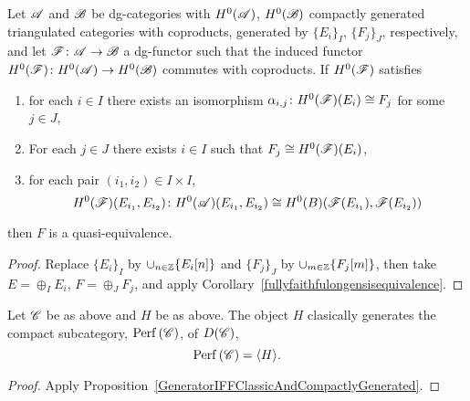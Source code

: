 \documentclass[dissertation.tex]{subfiles}
\begin{document}
\begin{prop}
  Let $\mathscr{A}$ and $\mathscr{B}$ be dg-categories with $H^0(\mathscr{A})$, $H^0(\mathscr{B})$ compactly generated triangulated categories with coproducts, generated by $\{E_i\}_I$, $\{F_j\}_J$, respectively, and let $\mathscr{F} \colon \mathscr{A} \to\mathscr{B}$ a dg-functor such that the induced functor $H^0(\mathscr{F}) \colon H^0(\mathscr{A}) \to H^0(\mathscr{B})$ commutes with coproducts.
  If $H^0(\mathscr{F})$ satisfies
  \begin{enumerate}
  \item
    for each $i \in I$ there exists an isomorphism $\alpha_{i,j} \colon H^0(\mathscr{F})(E_i) \cong F_j$ for some $j \in J$,
  \item
    For each $j \in J$ there exists $i \in I$ such that $F_j \cong H^0(\mathscr{F})(E_i)$,
  \item
    for each pair $(i_1, i_2) \in I \times I$,
    $$H^0(\mathscr{F})(E_{i_1}, E_{i_2}) \colon H^0(\mathscr{A})(E_{i_1}, E_{i_2}) \cong H^0(B)(\mathscr{F}(E_{i_1}), \mathscr{F}(E_{i_2}))$$
  \end{enumerate}
  then $F$ is a quasi-equivalence.

  \begin{proof}
    Replace $\{E_i\}_I$ by $\cup_{n \in \mathbb{Z}}\{E_i[n]\}$ and $\{F_j\}_J$ by $\cup_{m \in \mathbb{Z}}\{F_j[m]\}$, then take $E = \oplus_I E_i$, $F = \oplus_J F_j$, and apply Corollary~\ref{fullyfaithfulongensisequivalence}.
  \end{proof}
\end{prop}

\begin{cor}
  Let $\mathscr{C}$ be as above and $H$ be as above.
  The object $H$ clasically generates the compact subcategory, $\operatorname{Perf}\left(\mathscr{C}\right)$, of $D(\mathscr{C})$,
  $$\operatorname{Perf}\left(\mathscr{C}\right) = \langle H \rangle.$$

  \begin{proof}
    Apply Proposition~\ref{GeneratorIFFClassicAndCompactlyGenerated}.
  \end{proof}
\end{cor}
\end{document}
